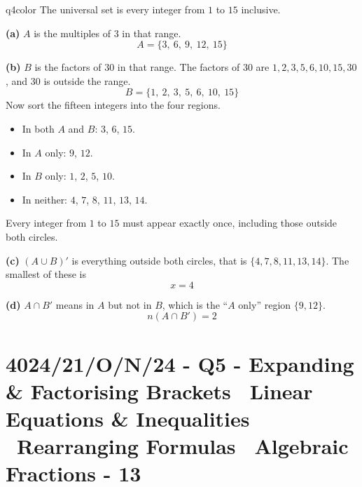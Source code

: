 \documentclass[11pt,a4paper]{article}
\newcommand{\examq}[4]{\section[#1 - Q#2]{#1 - Q#2 - #3 - #4}}
\begin{document}
\begin{ansbox}{q4color}
The universal set is every integer from $1$ to $15$ inclusive.

\textbf{(a)} $A$ is the multiples of $3$ in that range.
\[ A = \{3,\ 6,\ 9,\ 12,\ 15\} \]

\textbf{(b)} $B$ is the factors of $30$ in that range. The factors of $30$ are $1, 2, 3, 5, 6, 10, 15, 30$, and $30$ is outside the range.
\[ B = \{1,\ 2,\ 3,\ 5,\ 6,\ 10,\ 15\} \]
Now sort the fifteen integers into the four regions.
\begin{itemize}[nosep,leftmargin=*]
  \item In both $A$ and $B$: $3$, $6$, $15$.
  \item In $A$ only: $9$, $12$.
  \item In $B$ only: $1$, $2$, $5$, $10$.
  \item In neither: $4$, $7$, $8$, $11$, $13$, $14$.
\end{itemize}
Every integer from $1$ to $15$ must appear exactly once, including those outside both circles.

\begin{center}
\end{center}

\textbf{(c)} $(A \cup B)'$ is everything outside both circles, that is $\{4, 7, 8, 11, 13, 14\}$. The smallest of these is
\[ x = 4 \]

\textbf{(d)} $A \cap B'$ means in $A$ but not in $B$, which is the ``$A$ only'' region $\{9, 12\}$.
\[ n(A \cap B') = 2 \]
\end{ansbox}

\examq{4024/21/O/N/24}{5}{Expanding \& Factorising Brackets \textperiodcentered\ Linear Equations \& Inequalities \textperiodcentered\ Rearranging Formulas \textperiodcentered\ Algebraic Fractions}{13}
\end{document}

